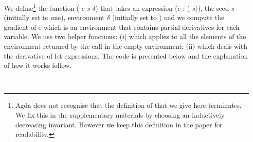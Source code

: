 We define\footnote{Agda does not recognise that the definition of  that
we give here terminates.  We fix this in the supplementary materials by choosing
an inductively decreasing invariant.  However we keep this definition in the
paper for readability.} the function ( $e$ $s$ $\delta$) that takes an
expression ($e$ :   ( $s$)), the seed $s$ (initially set
to one), environment $\delta$ (initially set to ) and we compute
the gradient of $e$ which is an environment that contains partial derivatives
for each variable.
We use two helper functions: (i)  which applies  to all
the elements of the environment returned by the  call in the empty environment;
(ii)  which deals with the derivative of let expressions.  The code is presented
below and the explanation of how it works follow.
\begin{code}[hide]%
%
\>[2]\AgdaSymbol{\{-\#}\AgdaSpace{}%
\AgdaSpace{}%
\AgdaSymbol{\#-\}}%
\>[23]\<%
\\
%
\>[23]\<%
\end{code}
